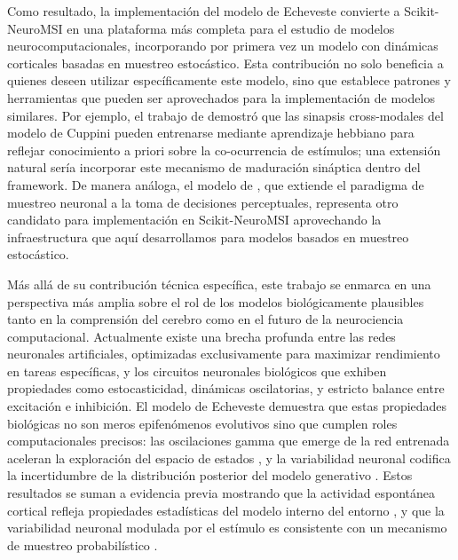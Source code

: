 Como resultado, la implementación del modelo de Echeveste convierte a Scikit-NeuroMSI en una plataforma más completa para el estudio de modelos neurocomputacionales, incorporando por primera vez un modelo con dinámicas corticales basadas en muestreo estocástico. Esta contribución no solo beneficia a quienes deseen utilizar específicamente este modelo, sino que establece patrones y herramientas que pueden ser aprovechados para la implementación de modelos similares. Por ejemplo, el trabajo de \citet{ursino2017multisensory} demostró que las sinapsis cross-modales del modelo de Cuppini pueden entrenarse mediante aprendizaje hebbiano para reflejar conocimiento a priori sobre la co-ocurrencia de estímulos; una extensión natural sería incorporar este mecanismo de maduración sináptica dentro del framework. De manera análoga, el modelo de \citet{haefner2016perceptual}, que extiende el paradigma de muestreo neuronal a la toma de decisiones perceptuales, representa otro candidato para implementación en Scikit-NeuroMSI aprovechando la infraestructura que aquí desarrollamos para modelos basados en muestreo estocástico.


Más allá de su contribución técnica específica, este trabajo se enmarca en una perspectiva más amplia sobre el rol de los modelos biológicamente plausibles tanto en la comprensión del cerebro como en el futuro de la neurociencia computacional. Actualmente existe una brecha profunda entre las redes neuronales artificiales, optimizadas exclusivamente para maximizar rendimiento en tareas específicas, y los circuitos neuronales biológicos que exhiben propiedades como estocasticidad, dinámicas oscilatorias, y estricto balance entre excitación e inhibición. El modelo de Echeveste demuestra que estas propiedades biológicas no son meros epifenómenos evolutivos sino que cumplen roles computacionales precisos: las oscilaciones gamma que emerge de la red entrenada aceleran la exploración del espacio de estados \citep{echeveste2020cortical}, y la variabilidad neuronal codifica la incertidumbre de la distribución posterior del modelo generativo \citep{echeveste2020cortical}. Estos resultados se suman a evidencia previa mostrando que la actividad espontánea cortical refleja propiedades estadísticas del modelo interno del entorno \citep{berkes2011spontaneous}, y que la variabilidad neuronal modulada por el estímulo es consistente con un mecanismo de muestreo probabilístico \citep{banyai2019stimulus}.

